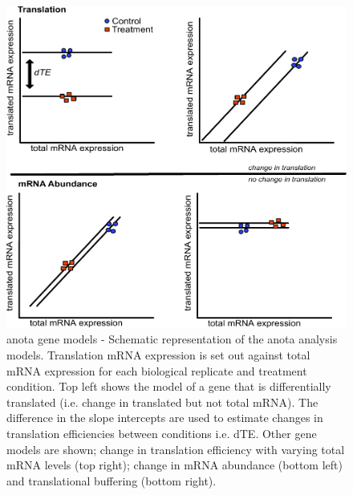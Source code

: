 \documentclass[
  12pt,
  openany]{book}
\begin{document}
\begin{figure}
  \includegraphics{./figures/geneModes_anota_Larsson.pdf}
  \caption{anota gene models - Schematic representation of the anota analysis models. Translation mRNA expression is set out against total mRNA expression for each biological replicate and treatment condition. Top left shows the model of a gene that is differentially translated (i.e. change in translated but not total mRNA). The difference in the slope intercepts are used to estimate changes in translation efficiencies between conditions i.e. dTE. Other gene models are shown; change in translation efficiency with varying total mRNA levels (top right); change in mRNA abundance (bottom left) and translational buffering (bottom right).
  \label{fig:anota}}
\end{figure}
\end{document}
